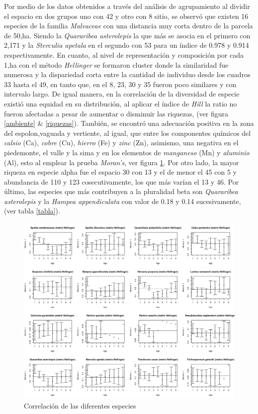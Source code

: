 \documentclass[11pt,]{article}
\begin{document}
Por medio de los datos obtenidos a través del análisis de agrupamiento
al dividir el espacio en dos grupos uno con 42 y otro con 8 sitio, se
observó que existen 16 especies de la familia \emph{Malvaceae} con una
distancia muy corta dentro de la parcela de 50,ha. Siendo la
\emph{Quararibea asterolepis} la que más se asocia en el primero con
2,171 y la \emph{Sterculia apetala} en el segundo con 53 para un índice
de 0.978 y 0.914 respectivamente. En cuanto, al nivel de representación
y composición por cada 1,ha con el método \emph{Hellinger} se formaron
cluster donde la similaridad fue numerosa y la dispariedad corta entre
la cantidad de individuo desde los cuadros 33 hasta el 49, en tanto que,
en el 8, 23, 30 y 35 fueron poco similares y con intervalo largo. De
igual manera, en la correlación de la diversidad de especie existió una
equidad en su distribución, al aplicar el índice de \emph{Hill} la ratio
no fueron afectadas a pesar de aumentar o disminuir las riquezas, (ver
figura \ref{ambiente} \& \ref{riquezas}). También, se encontró una
adecuación positiva en la zona del espolon,vaguada y vertiente, al
igual, que entre los componentes químicos del \emph{calsio} (Ca),
\emph{cobre} (Cu), \emph{hierro} (Fe) y \emph{zinc} (Zn), asimismo, una
negativa en el piedemonte, el valle y la sima y en los elementos de
\emph{manganeso} (Mn) y \emph{aluminio} (Al), esto al emplear la prueba
\emph{Moran's}, ver figura \ref{diversidad}. Por otro lado, la mayor
riqueza en especie alpha fue el espacio 30 con 13 y el de menor el 45
con 5 y abundancia de 110 y 123 cosecutivamente, los que más varían el
13 y 46. Por último, las especies que más contribuyen a la pluralidad
beta son \emph{Quararibea asterolepis} y la \emph{Hampea appendiculata}
con valor de 0.18 y 0.14 sucesivamente, (ver tabla \ref{tabla}).

\begin{figure}
\centering
\includegraphics[width=1.00000\textwidth]{ecologia_espacial_files/figure-markdown_github/unnamed-chunk-10-1.png}
\caption{Correlación de las diferentes especies\label{diversidad}}
\end{figure}
\end{document}
